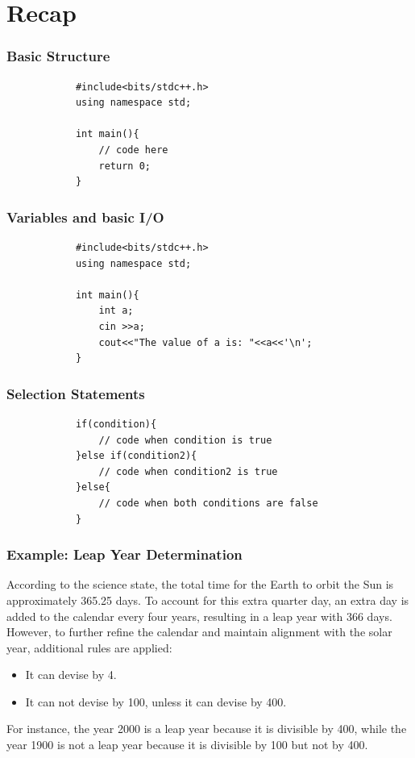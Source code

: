 \documentclass[xcolor=dvipsnames]{beamer}
\begin{document}
    \section{Recap}
    \begin{frame}[fragile]
        \frametitle{Basic Structure}
        \begin{verbatim}
            #include<bits/stdc++.h>
            using namespace std;

            int main(){
                // code here
                return 0;
            }            
        \end{verbatim}
    \end{frame}
    \begin{frame}[fragile]
        \frametitle{Variables and basic I/O}
        \begin{verbatim}
            #include<bits/stdc++.h>
            using namespace std;

            int main(){
                int a;
                cin >>a;
                cout<<"The value of a is: "<<a<<'\n';
            }
        \end{verbatim}
    \end{frame}
    \begin{frame}[fragile]
        \frametitle{Selection Statements}
        \begin{verbatim}
            if(condition){
                // code when condition is true
            }else if(condition2){
                // code when condition2 is true
            }else{
                // code when both conditions are false
            }
        \end{verbatim}
    \end{frame}
    \begin{frame}
        \frametitle{Example: Leap Year Determination}
        According to the science state, the total time for the Earth to orbit the Sun is approximately 365.25 days. To account for this extra quarter day, an extra day is added to the calendar every four years, resulting in a leap year with 366 days. However, to further refine the calendar and maintain alignment with the solar year, additional rules are applied:
        \begin{itemize}
            \item It can devise by 4.
            \item It can not devise by 100, unless it can devise by 400.
        \end{itemize}
        For instance, the year 2000 is a leap year because it is divisible by 400, while the year 1900 is not a leap year because it is divisible by 100 but not by 400.
    \end{frame}
\end{document}
